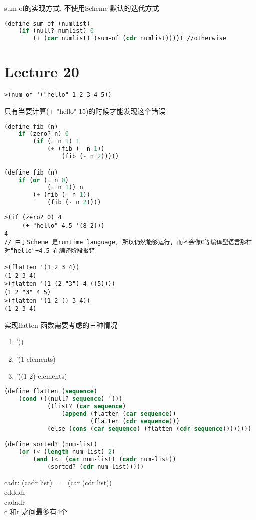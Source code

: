 \documentclass{article}
\begin{document}
sum-of的实现方式, 不使用Scheme 默认的迭代方式
\begin{lstlisting}[language = Lisp]
(define sum-of (numlist)
	(if (null? numlist) 0
		(+ (car numlist) (sum-of (cdr numlist))))) //otherwise
\end{lstlisting}

\section{Lecture 20}
\begin{verbatim}
>(num-of '("hello" 1 2 3 4 5))
\end{verbatim}
只有当要计算(+ "hello" 15)的时候才能发现这个错误

\begin{lstlisting}[language = Lisp]
(define fib (n)
	if (zero? n) 0
		(if (= n 1) 1
			(+ (fib (- n 1))
				(fib (- n 2)))))

(define fib (n)
	if (or (= n 0)
			(= n 1)) n
		(+ (fib (- n 1))
			(fib (- n 2))))
\end{lstlisting}

\begin{verbatim}
>(if (zero? 0) 4
	 (+ "hello" 4.5 '(8 2)))
4
// 由于Scheme 是runtime language, 所以仍然能够运行, 而不会像C等编译型语言那样对"hello"+4.5 在编译阶段报错

>(flatten '(1 2 3 4))
(1 2 3 4)
>(flatten '(1 (2 "3") 4 ((5))))
(1 2 "3" 4 5)
>(flatten '(1 2 () 3 4))
(1 2 3 4)
\end{verbatim}

实现flatten 函数需要考虑的三种情况
\begin{enumerate}
	\item '()
	\item '(1 elements)
	\item '((1 2) elements)
\end{enumerate}

\begin{lstlisting}[language = Lisp]
(define flatten (sequence)
	(cond (((null? sequence) '())
			((list? (car sequence)
				(append (flatten (car sequence))
						(flatten (cdr sequence)))
			(else (cons (car sequence) (flatten (cdr sequence))))))))

(define sorted? (num-list)
	(or (< (length num-list) 2)
		(and (<= (car num-list) (cadr num-list))
			(sorted? (cdr num-list)))))
\end{lstlisting}

\bigskip\noindent
cadr: (cadr list) == (car (cdr list))\\
cddddr\\
cadadr\\
c 和r 之间最多有4个
\end{document}
